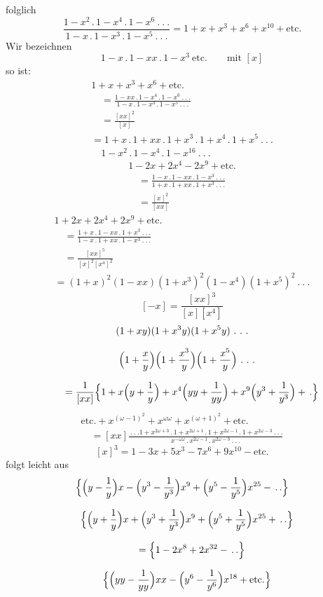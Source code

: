folglich
\[
\frac{1-x^2\,.\,1-x^4\,.\,1-x^6\ .\ .\ .}{1-x\,.\,1-x^3\,.\,1-x^5\ .\ .\ .}
=1+x+x^3+x^6+x^{10}+\text{etc.}
\]
Wir bezeichnen
\[
1-x\,.\,1-xx\,.\,1-x^3\ \text{etc.}\qquad\text{mit }[x]
\]
so ist:
\[
\begin{gathered}
1+x+x^3+x^6+\text{etc.}
\\[7pt]\quad{}=\frac{1-xx\,.\,1-x^4\,.\,1-x^6\ .\ .\ .}{1-x\,.\,1-x^3\,.\,1-x^5\ .\ .\ .}\\[7pt]\quad{}=\frac{[xx]^2}{[x]}\\[7pt]
=1+x\,.\,1+xx\,.\,1+x^3\,.\,1+x^4\,.\,1+x^5\ .\ .\ .\\[7pt]\quad{}1-x^2\,.\,1-x^4\,.\,1-x^{16}\ .\ .\ .
\end{gathered}
\]
\[
\begin{gathered}1-2x+2x^4-2x^9+\text{etc.}
\\[7pt]\quad{}=\frac{1-x\,.\,1-xx\,.\,1-x^3\ .\ .\ .}{1+x\,.\,1+xx\,.\,1+x^3\ .\ .\ .}\\[7pt]\quad{}=\frac{[x]^2}{[xx]}\end{gathered}
\]
\[
\begin{gathered}
1+2x+2x^4+2x^9+\text{etc.}
\\[7pt]\quad{}=\frac{1+x\,.\,1-xx\,.\,1+x^3\ .\ .\ .}{1-x\,.\,1+xx\,.\,1-x^3\ .\ .\ .}\\[7pt]\quad{}=\frac{[xx]^5}{[x]^2[x^4]^2}\\[7pt]
=(1+x)^2(1-xx)(1+x^3)^2(1-x^4)(1+x^5)^2\ .\ .\ .
\end{gathered}
\]
\[
[-x]=\frac{[xx]^3}{[x][x^4]}
\]
\[
\begin{gathered}
(1+xy)(1+x^3y)(1+x^5y)\ .\ .\ .
\\[7pt]\quad{}\Bigl(1+\frac{x}{y}\Bigr)\Bigl(1+\frac{x^3}{y}\Bigr)\Bigl(1+\frac{x^5}{y}\Bigr)\ .\ .\ .\\[7pt]
\qquad=\frac{1}{[xx]}\Bigl\{1+x\Bigl(y+\frac{1}{y}\Bigr)+x^4\Bigl(yy+\frac{1}{yy}\Bigr)+x^9\Bigl(y^3+\frac{1}{y^3}\Bigr)+\,.\Bigr\}
\end{gathered}
\]
\[
\begin{gathered}\text{etc.}+x^{(\omega-1)^2}+x^{\omega\omega}+x^{(\omega+1)^2}+\text{etc.}
\\[7pt]\quad{}=[xx]\frac{\ .\ .\ .1+x^{2\omega+3}\,.\,1+x^{2\omega+1}\,.\,1+x^{2\omega-1}\,.\,1+x^{2\omega-3}\ .\ .\ .}{x^{-\omega\omega}\,.\,x^{2\omega-1}\,.\,x^{2\omega-3}\ .\ .\ .}\end{gathered}
\]
\[
[x]^3=1-3x+5x^3-7x^6+9x^{10}-\text{etc.}
\]
folgt leicht aus
\[
\begin{gathered}
\Bigl\{\Bigl(y-\frac{1}{y}\Bigr)x-\Bigl(y^3-\frac{1}{y^3}\Bigr)x^9+\Bigl(y^5-\frac{1}{y^5}\Bigr)x^{25}-\,.\,.\Bigr\}
\\[7pt]\quad{}\Bigl\{\Bigl(y+\frac{1}{y}\Bigr)x+\Bigl(y^3+\frac{1}{y^3}\Bigr)x^9+\Bigl(y^5+\frac{1}{y^5}\Bigr)x^{25}+\,.\,.\Bigr\}\\[7pt]
\qquad=\Bigl\{1-2x^8+2x^{32}-\,.\,.\Bigr\}
\\[7pt]\quad{}\Bigl\{\Bigl(yy-\frac{1}{yy}\Bigr)xx-\Bigl(y^6-\frac{1}{y^6}\Bigr)x^{18}+\text{etc.}\Bigr\}
\end{gathered}
\]

